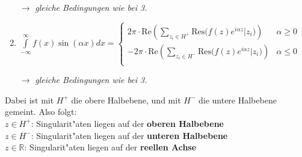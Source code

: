 \begin{enumerate}
	\(\to\) \emph{gleiche Bedingungen wie bei 3.}
	
	\item	\( \displaystyle \int\limits_{-\infty}^\infty f(x) \sin(\alpha x)dx = \begin{cases}
	\displaystyle 2\pi\cdot \text{Re}\left(\sum_{z_i \in H^+} \text{Res}\big(f(z)e^{i\alpha z} \big\vert z_i\big) \right)
	&	\alpha \geqslant 0\\
	\displaystyle -2\pi\cdot \text{Re}\left(\sum_{z_i \in H^-} \text{Res}\big(f(z)e^{i\alpha z} \big\vert z_i\big) \right)
	&	\alpha \leqslant 0\\
	\end{cases} \)
	
	\(\to\) \emph{gleiche Bedingungen wie bei 3.}
\end{enumerate}

Dabei ist mit $H^+$ die obere Halbebene, und mit $H^-$ die untere Halbebene gemeint. Also folgt:\\
\(z \in H^+\): Singularit"aten liegen auf der \textbf{oberen Halbebene}\\
\(z \in H^-\): Singularit"aten liegen auf der \textbf{unteren Halbebene}\\
\(z \in \mathbb{R}\): Singularit"aten liegen auf der \textbf{reellen Achse}\\





